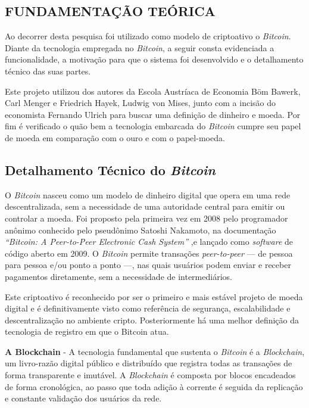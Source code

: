 \documentclass[article,12pt,oneside,a4paper,english,brazil]{unifil}
\begin{document}
\begin{Spacing}{1.5}
\section*{FUNDAMENTAÇÃO TEÓRICA}

Ao decorrer desta pesquisa foi utilizado como modelo de criptoativo o \textit{Bitcoin}. Diante da tecnologia empregada no \textit{Bitcoin}, a seguir consta evidenciada a funcionalidade, a motivação para que o sistema foi desenvolvido e o detalhamento técnico das suas partes.

Este projeto utilizou dos autores da Escola Austríaca de Economia Böm Bawerk, Carl Menger e Friedrich Hayek, Ludwig von Mises, junto com a incisão do economista Fernando Ulrich para buscar uma definição de dinheiro e moeda. Por fim é verificado o quão bem a tecnologia embarcada do \textit{Bitcoin} cumpre seu papel de moeda em comparação com o ouro e com o papel-moeda. 

\subsection*{Detalhamento Técnico do \textit{Bitcoin}} \label{sec:bitcoin}

O \textit{Bitcoin} nasceu como um modelo de dinheiro digital que opera em uma rede descentralizada, sem a necessidade de uma autoridade central para emitir ou controlar a moeda. Foi proposto pela primeira vez em 2008 pelo programador anônimo conhecido pelo pseudônimo Satoshi Nakamoto, na documentação \textit{``Bitcoin: A Peer-to-Peer Electronic Cash System''} \cite{Nakamoto2009} ,e lançado como \textit{software} de código aberto em 2009. O \textit{Bitcoin} permite transações \textit{peer-to-peer} — de pessoa para pessoa e/ou ponto a ponto —, nas quais usuários podem enviar e receber pagamentos diretamente, sem a necessidade de intermediários.

Este criptoativo é reconhecido por ser o primeiro e mais estável projeto de moeda digital e é definitivamente visto como referência de segurança, escalabilidade e descentralização no ambiente cripto. Posteriormente há uma melhor definição da tecnologia de registro em que o Bitcoin atua.

\textbf{A Blockchain} \label{subsec:blockchain} - A tecnologia fundamental que sustenta o \textit{Bitcoin} é a \textit{Blockchain}, um livro-razão digital público e distribuído que registra todas as transações de forma transparente e imutável. A \textit{Blockchain} é composta por blocos encadeados de forma cronológica, ao passo que toda adição à corrente é seguida da replicação e constante validação dos usuários da rede.


\end{Spacing}
\end{document}
